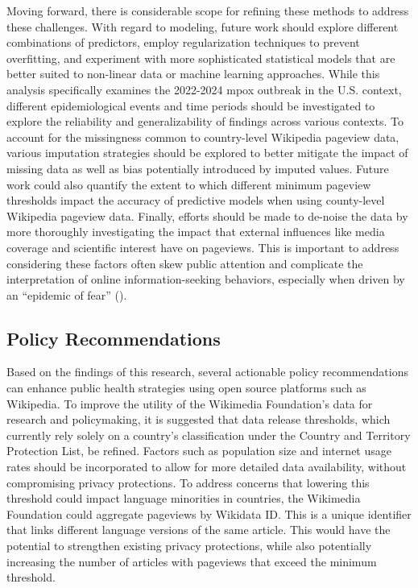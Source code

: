 \documentclass[
  12pt,
]{article}
\begin{document}
Moving forward, there is considerable scope for refining these methods
to address these challenges. With regard to modeling, future work should
explore different combinations of predictors, employ regularization
techniques to prevent overfitting, and experiment with more
sophisticated statistical models that are better suited to non-linear
data or machine learning approaches. While this analysis specifically
examines the 2022-2024 mpox outbreak in the U.S. context, different
epidemiological events and time periods should be investigated to
explore the reliability and generalizability of findings across various
contexts. To account for the missingness common to country-level
Wikipedia pageview data, various imputation strategies should be
explored to better mitigate the impact of missing data as well as bias
potentially introduced by imputed values. Future work could also
quantify the extent to which different minimum pageview thresholds
impact the accuracy of predictive models when using county-level
Wikipedia pageview data. Finally, efforts should be made to de-noise the
data by more thoroughly investigating the impact that external
influences like media coverage and scientific interest have on
pageviews. This is important to address considering these factors often
skew public attention and complicate the interpretation of online
information-seeking behaviors, especially when driven by an ``epidemic
of fear'' ().

\subsection{Policy Recommendations}\label{policy-recommendations}

Based on the findings of this research, several actionable policy
recommendations can enhance public health strategies using open source
platforms such as Wikipedia. To improve the utility of the Wikimedia
Foundation's data for research and policymaking, it is suggested that
data release thresholds, which currently rely solely on a country's
classification under the Country and Territory Protection List, be
refined. Factors such as population size and internet usage rates should
be incorporated to allow for more detailed data availability, without
compromising privacy protections. To address concerns that lowering this
threshold could impact language minorities in countries, the Wikimedia
Foundation could aggregate pageviews by Wikidata ID. This is a unique
identifier that links different language versions of the same article.
This would have the potential to strengthen existing privacy
protections, while also potentially increasing the number of articles
with pageviews that exceed the minimum threshold.~
\end{document}
